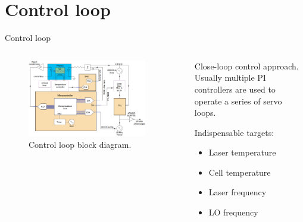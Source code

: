 \section{Control loop}

\begin{frame}{Control loop}

    \begin{columns}[c, onlytextwidth]

        \begin{column}{0.6\textwidth}

            \begin{figure}
                \centering
                \includegraphics[width=0.9\textwidth]{img/Control-loop}
                \caption{Control loop block diagram.}
            \end{figure}

        \end{column}

        \begin{column}{0.4\textwidth}

            Close-loop control approach.
            Usually multiple PI controllers are used to operate a series of servo loops.

            \vspace{10pt}

            Indispensable targets:

            \begin{itemize}
                \item Laser temperature
                \item Cell temperature
                \item Laser frequency
                \item LO frequency
            \end{itemize}

        \end{column}

    \end{columns}

\end{frame}



